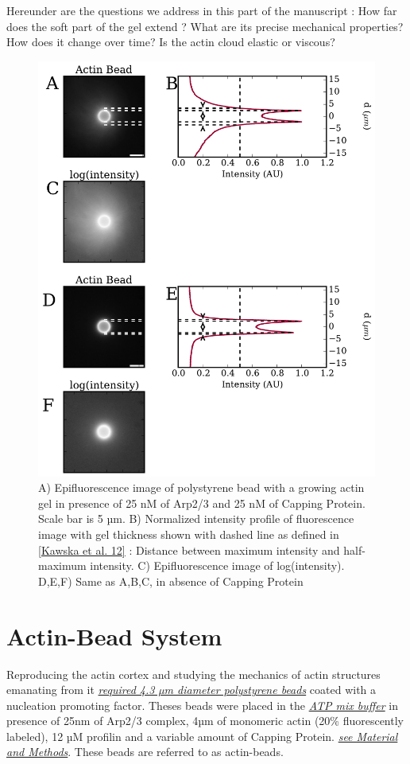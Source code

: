 \documentclass[A4paperpaper,11pt,english]{sphinxmanual}
\begin{document}
Hereunder are the questions we address in this part of the manuscript :
How far does the soft part of the gel extend ? What are its precise mechanical properties?  How does it change
over time?  Is the actin cloud elastic or viscous?
\begin{figure}[htbp]
\centering
\capstart

\includegraphics[width=0.800\linewidth]{intensity_profile_xnM_Arp_xnM_CP_xmin.pdf}
\caption{A) Epifluorescence image of polystyrene bead with a growing actin gel in
presence of 25 nM of Arp2/3 and 25 nM of Capping Protein. Scale bar is 5
µm.  B) Normalized intensity profile of fluorescence image with gel thickness
shown with dashed line as defined in {\hyperref[parts/part3:kawska2012]{{[}Kawska et al. 12{]}}} :
Distance between maximum intensity and half-maximum intensity.  C)
Epifluorescence image of log(intensity). D,E,F) Same as A,B,C, in absence
of Capping Protein}\label{parts/part3:fig-intensity-profile}\end{figure}


\section{Actin-Bead System}
\label{parts/part3:actin-bead-system}
Reproducing the actin cortex and studying the mechanics of actin structures
emanating from it {\hyperref[parts/part2:bead-preparation]{\emph{required 4.3 µm diameter polystyrene beads}}}
coated with a nucleation promoting factor. Theses beads were placed
in the {\hyperref[parts/part2:atp-mix-buffer]{\emph{ATP mix buffer}}} in presence of 25nm of Arp2/3
complex, 4µm of monomeric actin (20\% fluorescently labeled), 12 µM profilin and
a variable amount of Capping Protein. {\hyperref[parts/part2:m-et-m]{\emph{see Material and Methods}}}.
These beads are referred to as actin-beads.
\end{document}
